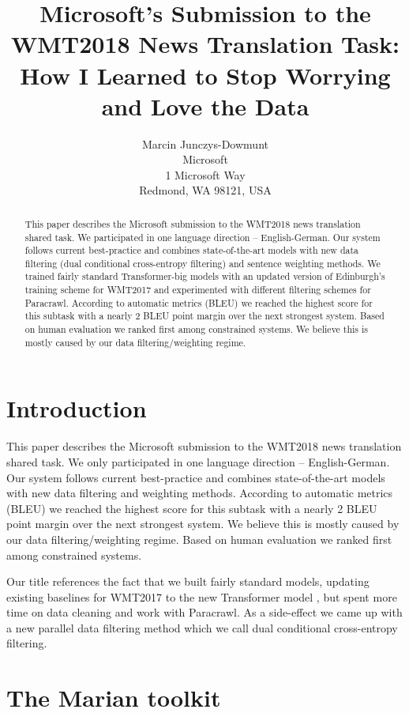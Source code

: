 \documentclass[11pt,a4paper]{article}
\title{Microsoft's Submission to the WMT2018 News Translation Task:\\
How I Learned to Stop Worrying and Love the Data}
\author{Marcin Junczys-Dowmunt \\
Microsoft\\
1 Microsoft Way\\
Redmond, WA 98121, USA}
\date{}
\begin{document}
\maketitle
\begin{abstract}

This paper describes the Microsoft submission to the WMT2018 news translation shared task. We  participated in one language direction -- English-German. Our system follows current best-practice and combines state-of-the-art models with new data filtering (dual conditional cross-entropy filtering) and sentence weighting methods. We trained fairly standard Transformer-big models with an updated version of Edinburgh's training scheme for WMT2017 and experimented with different filtering schemes for Paracrawl. According to automatic metrics (BLEU) we reached the highest score for this subtask with a nearly 2 BLEU point margin over the next strongest system. Based on human evaluation we ranked first among constrained systems. 
We believe this is mostly caused by our data filtering/weighting regime.
\end{abstract}

\section{Introduction}

This paper describes the Microsoft submission to the WMT2018 \cite{bojar-EtAl:2018:WMT1} news translation shared task. We only participated in one language direction -- English-German. Our system follows current best-practice and combines state-of-the-art models with new data filtering and weighting methods.  
According to automatic metrics (BLEU) we reached the highest score for this subtask with a nearly 2 BLEU point margin over the next strongest system. We believe this is mostly caused by our data filtering/weighting regime. 
Based on human evaluation we ranked first among constrained systems. 

Our title references the fact that we built fairly standard models, updating existing baselines for WMT2017 to the new Transformer model  \cite{NIPS2017_7181}, but spent more time on data cleaning and work with Paracrawl. As a side-effect we came up with a new parallel data filtering method which we call dual conditional cross-entropy filtering. 

\section{The Marian toolkit}
\end{document}
